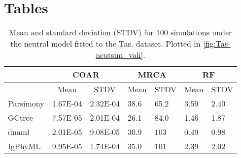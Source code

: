 \chapter{Tables}

\begin{table}[!ht]
\centering
\begin{tabular}{|l|l|l|l|l|l|l|}
\hline
 & \multicolumn{2}{c|}{COAR}                             & \multicolumn{2}{c|}{MRCA}                             & \multicolumn{2}{c|}{RF}                               \\ \hline
                 & \multicolumn{1}{c|}{Mean} & \multicolumn{1}{c|}{STDV} & \multicolumn{1}{c|}{Mean} & \multicolumn{1}{c|}{STDV} & \multicolumn{1}{c|}{Mean} & \multicolumn{1}{c|}{STDV} \\ \hline
Parsimony        & 1.67E-04                  & 2.32E-04                  & 38.6                      & 65.2                      & 3.59                      & 2.40                      \\ \hline
GCtree           & 7.57E-05                  & 2.01E-04                  & 26.1                      & 84.0                      & 1.46                      & 1.87                      \\ \hline
dnaml            & 2.01E-05                  & 9.08E-05                  & 30.9                      & 103                       & 0.49                      & 0.98                      \\ \hline
IgPhyML          & 9.95E-05                  & 1.74E-04                  & 35.0                      & 101                       & 2.39                      & 2.02                      \\ \hline
\end{tabular}
\caption{
\label{tab:Tas-neutsim_vali}
Mean and standard deviation (STDV) for 100 simulations under the neutral model fitted to the Tas. dataset. Plotted in \ref{fig:Tas-neutsim_vali}.
}
\end{table}


